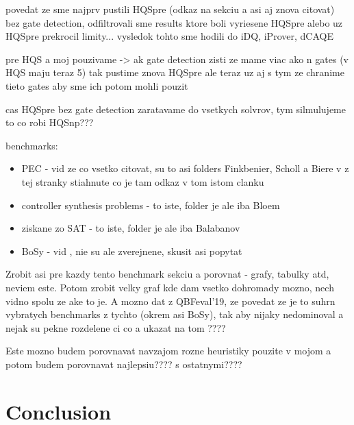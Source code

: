 \documentclass[
  digital, %
  twoside, %
  table,   %
  nolof,     %
  nolot,     %
]{fithesis3}
\theoremstyle{definition}
\theoremstyle{remark}
\begin{document}
povedat ze sme najprv pustili HQSpre (odkaz na sekciu a asi aj znova citovat) bez gate detection, odfiltrovali sme results ktore boli vyriesene HQSpre alebo uz HQSpre prekrocil limity... vysledok tohto sme hodili do iDQ, iProver, dCAQE

pre HQS a moj pouzivame -> ak gate detection zisti ze mame viac ako n gates (v HQS maju teraz 5) tak pustime znova HQSpre ale teraz uz aj s tym ze chranime tieto gates aby sme ich potom mohli pouzit

cas HQSpre bez gate detection zaratavame do vsetkych solvrov, tym silmulujeme to co robi HQSnp???

benchmarks:
\begin{itemize}
    \item PEC - vid \cite{HQSquantifierLocalization} ze co vsetko citovat, su to asi folders Finkbenier, Scholl a Biere v z tej stranky stiahnute co je tam odkaz v tom istom clanku
    \item controller synthesis problems - to iste, folder je ale iba Bloem
    \item ziskane zo SAT - to iste, folder je ale iba Balabanov
    \item BoSy - vid \cite{dCAQE}, nie su ale zverejnene, skusit asi popytat
\end{itemize}
Zrobit asi pre kazdy tento benchmark sekciu a porovnat - grafy, tabulky atd, neviem este. Potom zrobit velky graf kde dam vsetko dohromady mozno, nech vidno spolu ze ake to je. A mozno dat z QBFeval'19, ze povedat ze je to suhrn vybratych benchmarks z tychto (okrem asi BoSy), tak aby nijaky nedominoval a nejak su pekne rozdelene ci co a ukazat na tom ????

Este mozno budem porovnavat navzajom rozne heuristiky pouzite v mojom a potom budem porovnavat najlepsiu???? s ostatnymi????

\chapter{Conclusion}


\begingroup
\setlength{\emergencystretch}{8em}
\printbibliography[heading=bibintoc]
\endgroup

\end{document}
